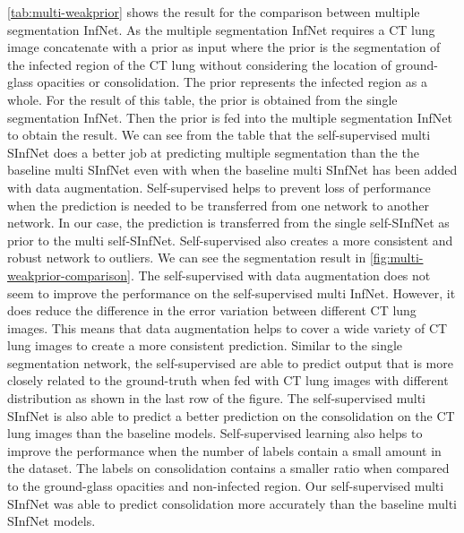  \ref{tab:multi-weakprior} shows the result for the comparison between multiple segmentation InfNet. As the multiple segmentation InfNet requires a CT lung image concatenate with a prior as input where the prior is the segmentation of the infected region of the CT lung without considering the location of ground-glass opacities or consolidation. The prior represents the infected region as a whole. For the result of this table, the prior is obtained from the single segmentation InfNet. Then the prior is fed into the multiple segmentation InfNet to obtain the result. We can see from the table that the self-supervised multi SInfNet does a better job at predicting multiple segmentation than the the baseline multi SInfNet even with when the baseline multi SInfNet has been added with data augmentation. Self-supervised helps to prevent loss of performance when the  prediction is needed to be transferred from one network to another network. In our case, the prediction is transferred from the single self-SInfNet as prior to the multi self-SInfNet.  Self-supervised also creates a more consistent and robust network to outliers. We can see the segmentation result in \ref{fig:multi-weakprior-comparison}. The self-supervised with data augmentation does not seem to improve the performance on the self-supervised multi InfNet. However, it does reduce the difference in the error variation between different CT lung images. This means that data augmentation helps to cover a wide variety of CT lung images to create a more consistent prediction. Similar to the single segmentation network, the self-supervised are able to predict output that is more closely related to the ground-truth when fed with CT lung images with different distribution as shown in the last row of the figure. The self-supervised multi SInfNet is also able to predict a better prediction on the consolidation on the CT lung images than the baseline models. Self-supervised learning also helps to improve the performance when the number of labels contain a small amount in the dataset. The labels on consolidation contains a smaller ratio when compared to the ground-glass opacities and non-infected region. Our self-supervised multi SInfNet was able to predict consolidation more accurately than the baseline multi SInfNet models.
   
